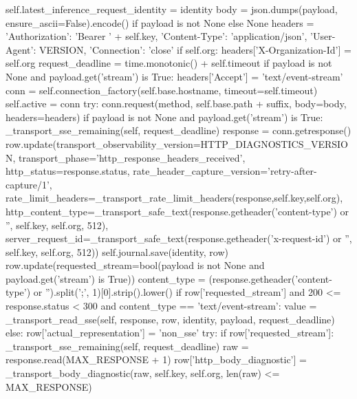 {                self.latest_inference_request_identity = identity
            body = json.dumps(payload, ensure_ascii=False).encode() if payload is not None else None
            headers = {'Authorization': 'Bearer ' + self.key, 'Content-Type': 'application/json',
                       'User-Agent': VERSION, 'Connection': 'close'}
            if self.org:
                headers['X-Organization-Id'] = self.org
            request_deadline = time.monotonic() + self.timeout
            if payload is not None and payload.get('stream') is True:
                headers['Accept'] = 'text/event-stream'
            conn = self.connection_factory(self.base.hostname, timeout=self.timeout)
            self.active = conn
            try:
                conn.request(method, self.base.path + suffix, body=body, headers=headers)
                if payload is not None and payload.get('stream') is True:
                    _transport_sse_remaining(self, request_deadline)
                response = conn.getresponse()
                row.update(transport_observability_version=HTTP_DIAGNOSTICS_VERSION,
                           transport_phase='http_response_headers_received',
                           http_status=response.status,
                           rate_header_capture_version='retry-after-capture/1',
                           rate_limit_headers=_transport_rate_limit_headers(response,self.key,self.org),
                           http_content_type=_transport_safe_text(response.getheader('content-type') or '', self.key, self.org, 512),
                           server_request_id=_transport_safe_text(response.getheader('x-request-id') or '', self.key, self.org, 512))
                self.journal.save(identity, row)
                row.update(requested_stream=bool(payload is not None and payload.get('stream') is True))
                content_type = (response.getheader('content-type') or '').split(';', 1)[0].strip().lower()
                if row['requested_stream'] and 200 <= response.status < 300 and content_type == 'text/event-stream':
                    value = _transport_read_sse(self, response, row, identity, payload, request_deadline)
                else:
                    row['actual_representation'] = 'non_sse'
                    try:
                        if row['requested_stream']:
                            _transport_sse_remaining(self, request_deadline)
                        raw = response.read(MAX_RESPONSE + 1)
                        row['http_body_diagnostic'] = _transport_body_diagnostic(raw, self.key, self.org, len(raw) <= MAX_RESPONSE)
}
